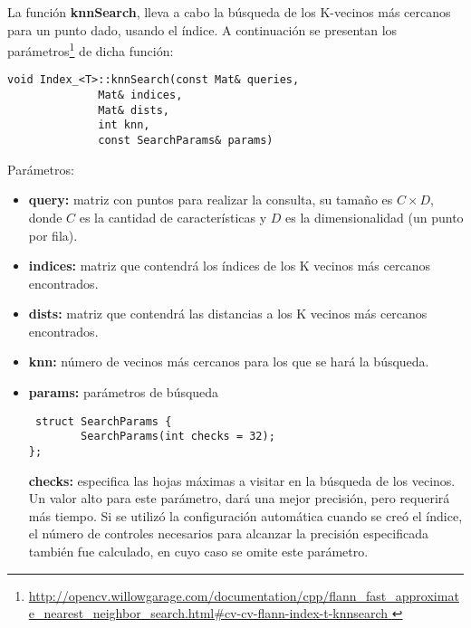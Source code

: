La funci\'on \textbf{knnSearch}, lleva a cabo la búsqueda de los K-vecinos más cercanos para un punto dado, usando el índice. A continuación se presentan los parámetros\footnote{\url{http://opencv.willowgarage.com/documentation/cpp/flann_fast_approximate_nearest_neighbor_search.html\#cv-cv-flann-index-t-knnsearch } } 
de dicha función:
\begin{lstlisting}
void Index_<T>::knnSearch(const Mat& queries, 
			  Mat& indices, 
			  Mat& dists, 
			  int knn, 
			  const SearchParams& params)
\end{lstlisting}
Parámetros:
\begin{itemize}
  \item \textbf{query:} matriz con puntos para realizar la consulta, su tamaño es $C \times D$, donde $C$ es la cantidad de caracter\'isticas y $D$ es la dimensionalidad (un punto por fila).
  \item \textbf{indices:} matriz que contendrá los índices de los K vecinos más cercanos encontrados.
  \item \textbf{dists:} matriz que contendrá las distancias a los K vecinos más cercanos encontrados.
  \item \textbf{knn:} número de vecinos más cercanos para los que se hará la búsqueda.
  \item \textbf{params:} parámetros de búsqueda
\begin{lstlisting}
 struct SearchParams {
        SearchParams(int checks = 32);
};
\end{lstlisting}
\textbf{checks:} especifica las hojas máximas a visitar en la búsqueda de los vecinos. Un valor alto para este parámetro, dará una mejor precisión, pero requerir\'a más tiempo. Si se utilizó la configuración automática cuando se creó el índice, el número de controles necesarios para alcanzar la precisión especificada también fue calculado, en cuyo caso se omite este parámetro.
\end{itemize}
